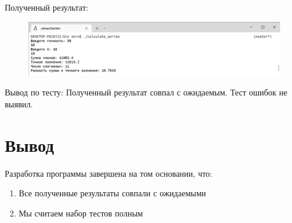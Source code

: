 \documentclass[a4paper]{article}
\begin{document}
\begin{enumerate}[label=\textbf{Тест \arabic*},start=3]
		\hspace{3mm}
		Полученный результат:
		
		\begin{figure}[h]
			\includegraphics[width=\textwidth,trim=0.5mm 0 0 0.5mm,clip]{tests/test50.png}
		\end{figure}
		
		Вывод по тесту: Полученный результат совпал с ожидаемым. Тест ошибок не выявил.
	\end{enumerate}
	
	\section{Вывод}
	
	Разработка программы завершена на том основании, что:
	
	\begin{enumerate}
		\item Все полученные результаты совпали с ожидаемыми
		\item Мы считаем набор тестов полным
	\end{enumerate}
	
\end{document}
